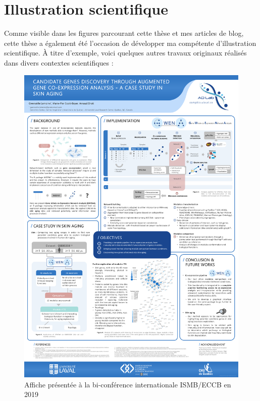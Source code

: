 \section{Illustration scientifique}

Comme visible dans les figures parcourant cette thèse et mes articles de blog, cette thèse a également été l'occasion de développer ma compétente d'illustration scientifique. À titre d'exemple, voici quelques autres travaux originaux réalisés dans divers contextes scientifiques : 

\begin{figure}[p]
    \centering
    \includegraphics[width=\textwidth]{img/annexe_projets_annexe/20190700_ISCMECCB_ppt.pdf}
    \caption{Affiche présentée à la bi-conférence internationale ISMB/ECCB en 2019}
    \label{fig:annexe_poster_ismb_eccb}
\end{figure}

